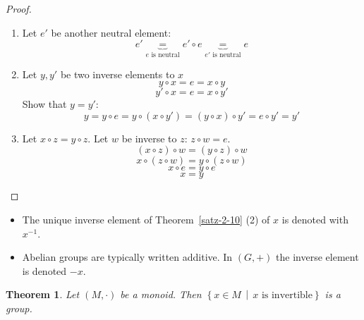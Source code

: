 \documentclass[a4paper,landscape,twocolumn]{article}
\newcommand\setdef[2]{\left\{#1\,\middle|\,#2\right\}}
\newtheorem{theorem}{Theorem}[section]
\begin{document}
\begin{proof}
  \begin{enumerate}
    \item Let $e'$ be another neutral element:
      \[ e' \underbrace{=}_{e \text{ is neutral}} e' \circ e \underbrace{=}_{e' \text{ is neutral}} e \]
    \item Let $y, y'$ be two inverse elements to $x$
      \[ y \circ x = e = x \circ y \]
      \[ y' \circ x = e = x \circ y' \]
      Show that $y = y'$:
      \[ y = y \circ e = y \circ (x \circ y') = (y \circ x) \circ y' = e \circ y' = y' \]
    \item Let $x \circ z = y \circ z$. Let $w$ be inverse to $z$: $z \circ w = e$.
      \[ (x \circ z) \circ w = (y \circ z) \circ w \]
      \[ x \circ (z \circ w) = y \circ (z \circ w) \]
      \[ x \circ e = y \circ e \]
      \[ x = y \]
  \end{enumerate}
\end{proof}

\begin{itemize}
  \item The unique inverse element of Theorem~\ref{satz-2-10} (2) of $x$ is denoted with $x^{-1}$.
  \item
    Abelian groups are typically written additive.
    In $(G, +)$ the inverse element is denoted $-x$.
\end{itemize}

\begin{theorem}
  \label{satz-2-12}
  Let $(M, \cdot)$ be a monoid. Then $\setdef{x \in M}{x \text{ is invertible}}$ is a group.
\end{theorem}
\end{document}
